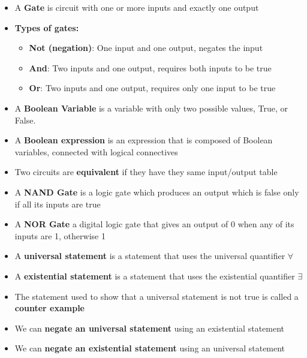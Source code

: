 \documentclass{report}
\begin{document}
\begin{itemize}
      \item A \textbf{Gate} is circuit with one or more inputs and exactly one output
      \item \textbf{Types of gates:}
        \begin{itemize}
          \item \textbf{Not (negation)}: One input and one output, negates the input
          \item \textbf{And}: Two inputs and one output, requires both inputs to be true
          \item \textbf{Or}: Two inputs and one output, requires only one input to be true
        \end{itemize}
      \item  A \textbf{Boolean Variable} is a variable with only two possible values, True, or False.
      \item A \textbf{Boolean expression} is an expression that is composed of Boolean variables, connected with logical connectives
      \item   Two circuits are \textbf{equivalent} if they have they same input/output table
      \item A \textbf{NAND Gate} is a logic gate which produces an output which is false only if all its inputs are true
      \item A \textbf{NOR Gate} a digital logic gate that gives an output of 0 when any of its inputs are 1, otherwise 1
      \item A \textbf{universal statement} is a statement that uses the universal quantifier $\forall$ 
      \item A \textbf{existential statement} is a statement that uses the existential quantifier $\exists$ 
        \item The statement used to show that a universal statement is not true is called a \textbf{counter example}
        \item We can \textbf{negate an universal statement} using an existential statement
        \item We can \textbf{negate an existential statement} using an universal statement

    \end{itemize}


    \pagebreak \bigbreak \noindent 
\end{document}
